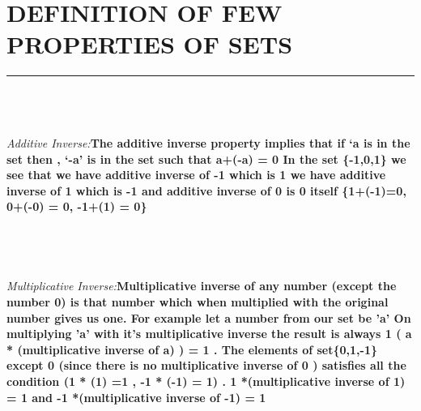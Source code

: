 \documentclass{article}
\begin{document}
\section * {DEFINITION OF FEW PROPERTIES OF SETS }
\hrule 
\bigskip
\\
\\
\\



\textit{Additive Inverse:\quad}\textbf{The additive inverse property implies that if ‘a is in the set then , ‘-a’ is in the set such that a+(-a) = 0 In the set \{-1,0,1\} we see that we have additive inverse of -1 which is 1   we have additive inverse of 1 which is -1 and additive inverse of 0 is 0 itself \{1+(-1)=0, 0+(-0) = 0, -1+(1) = 0\}}
\\
\\
\\
\\
\\
\textit{Multiplicative Inverse:\quad}\textbf{Multiplicative inverse of any number (except the number 0) is that number which when multiplied with the original number gives us one. For example let a number from our set be 'a' On multiplying 'a' with it's multiplicative inverse the result is always 1 ( a * (multiplicative inverse of a) ) = 1 . The elements of  set\{0,1,-1\} except 0 (since there is no multiplicative inverse of 0 ) satisfies all the condition 
(1 * (1) =1 , -1 * (-1) = 1) . 1 *(multiplicative inverse of 1) = 1
and -1 *(multiplicative inverse of -1) = 1}

\pagebreak 
\end{document}

